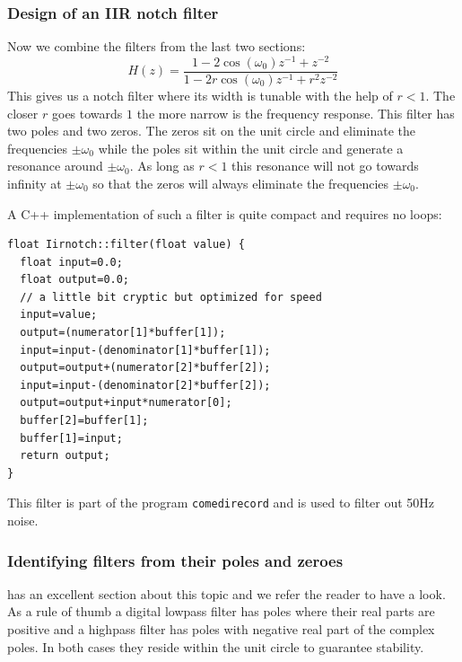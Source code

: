 \documentclass[12pt,a4paper]{article}
\begin{document}
\subsubsection{Design of an IIR notch filter}
Now we combine the filters from the last two sections:
\begin{equation} 
H(z) = \frac {1 - 2 \cos (\omega_{0}) z^{-1} + z^{-2}}{1 - 2r \cos (\omega_{0}) z^{-1} + r^{2} z^{-2}} 
\end{equation}
This gives us a notch filter where its width is tunable with the
help of $r<1$. The closer $r$ goes towards $1$ the more narrow
is the frequency response.
This filter has two poles and two zeros. The zeros sit on the unit
circle and eliminate the frequencies $\pm\omega_0$ while the
poles sit within the unit circle and generate a resonance around
$\pm\omega_0$. As long as $r<1$ this resonance will not go towards
infinity at $\pm\omega_0$ so that the zeros will always eliminate
the frequencies $\pm\omega_0$.

A C++ implementation of such a filter is quite compact and
requires no loops:
\begin{verbatim}
float Iirnotch::filter(float value) {
  float input=0.0;
  float output=0.0;
  // a little bit cryptic but optimized for speed
  input=value;
  output=(numerator[1]*buffer[1]);
  input=input-(denominator[1]*buffer[1]);
  output=output+(numerator[2]*buffer[2]);
  input=input-(denominator[2]*buffer[2]);
  output=output+input*numerator[0];
  buffer[2]=buffer[1];
  buffer[1]=input;
  return output;
}
\end{verbatim}
This filter is part of the program \texttt{comedirecord}
and is used to filter out 50Hz noise.

\subsubsection{Identifying filters from their poles and zeroes}
\citet[pp.333]{Proakis1996} has an excellent section about this topic
and we refer the reader to have a look. As a rule of thumb a digital
lowpass filter has poles where their real parts are positive and a
highpass filter has poles with negative real part of the complex
poles. In both cases they reside within the unit circle to guarantee
stability.





\end{document}
